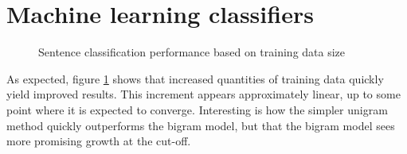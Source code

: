 \documentclass[a4paper,11pt]{kth-mag}
\begin{document}


\section{Machine learning classifiers}

\begin{figure}[h!]
  \centering

  \caption{Sentence classification performance based on training data size}
  \label{fig:data_size}
\end{figure}


As expected, figure \ref {fig:data_size} shows that increased quantities of training data quickly yield improved results. This increment appears approximately linear, up to some point where it is expected to converge. Interesting is how the simpler unigram method quickly outperforms the bigram model, but that the bigram model sees more promising growth at the cut-off.

\newpage
\end{document}
